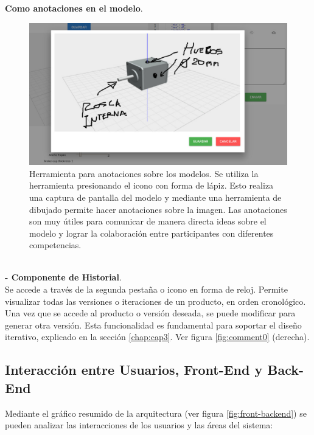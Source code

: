 \begin{itemize}
\begin{itemize}
\textbf{Como anotaciones en el modelo}. 
\begin{figure}[h]
    \includegraphics[width=12cm]{Img/Desarrollo/comentario2.jpg}
    \centering
    \caption{\footnotesize{ Herramienta para anotaciones sobre los modelos. Se utiliza la herramienta presionando el icono con forma de lápiz. Esto realiza una captura de pantalla del modelo y mediante una herramienta de dibujado permite hacer anotaciones sobre la imagen. Las anotaciones son muy útiles para comunicar de manera directa ideas sobre el modelo y lograr la colaboración entre participantes con diferentes competencias. }}
    \label{fig:comment2}
\end{figure}

\\




\vspace{5mm}
\textbf{- Componente de Historial}.\\
Se accede a través de la segunda pestaña o icono en forma de reloj. Permite visualizar todas las versiones o iteraciones de un producto, en orden cronológico. Una vez que se accede al producto o versión deseada, se puede modificar para generar otra versión. Esta funcionalidad es fundamental para soportar el diseño iterativo, explicado en la sección \ref{chap:cap3}. Ver figura \ref{fig:comment0} (derecha).


\end{itemize}



\end{itemize}


\clearpage
\subsection{Interacción entre Usuarios, Front-End y Back-End}

Mediante el gráfico resumido de la  arquitectura (ver figura \ref{fig:front-backend}) se pueden analizar las interacciones de los usuarios y las áreas del sistema:

